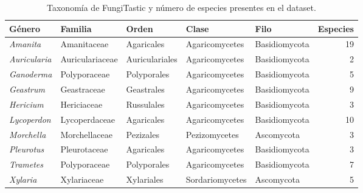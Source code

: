 \begin{table}[H]
\centering
\scriptsize
\caption{Taxonomía de FungiTastic y número de especies presentes en el dataset.}
\label{tab:taxmap}
\begin{tabularx}{\linewidth}{l Y Y Y Y r}
\toprule
\textbf{Género} & \textbf{Familia} & \textbf{Orden} & \textbf{Clase} & \textbf{Filo} & \textbf{Especies}\\
\midrule
\textit{Amanita} & Amanitaceae & Agaricales & Agaricomycetes & Basidiomycota & 19\\
\textit{Auricularia} & Auriculariaceae & Auriculariales & Agaricomycetes & Basidiomycota & 2\\
\textit{Ganoderma} & Polyporaceae & Polyporales & Agaricomycetes & Basidiomycota & 5\\
\textit{Geastrum} & Geastraceae & Geastrales & Agaricomycetes & Basidiomycota & 9\\
\textit{Hericium} & Hericiaceae & Russulales & Agaricomycetes & Basidiomycota & 3\\
\textit{Lycoperdon} & Lycoperdaceae & Agaricales & Agaricomycetes & Basidiomycota & 10\\
\textit{Morchella} & Morchellaceae & Pezizales & Pezizomycetes & Ascomycota & 3\\
\textit{Pleurotus} & Pleurotaceae & Agaricales & Agaricomycetes & Basidiomycota & 3\\
\textit{Trametes} & Polyporaceae & Polyporales & Agaricomycetes & Basidiomycota & 7\\
\textit{Xylaria} & Xylariaceae & Xylariales & Sordariomycetes & Ascomycota & 5\\
\bottomrule
\end{tabularx}
\end{table}
